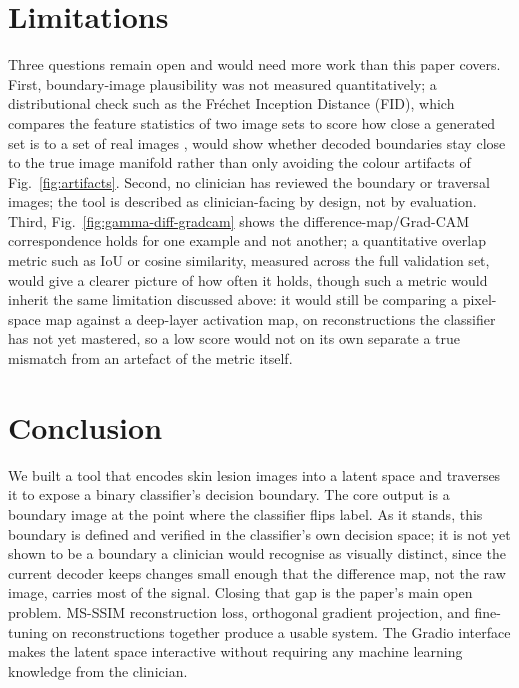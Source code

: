 \documentclass[conference,compsoc]{IEEEtran}
\begin{document}
\section{Limitations}
Three questions remain open and would need more work than this paper covers. First, boundary-image plausibility was not measured quantitatively; a distributional check such as the Fr\'echet Inception Distance (FID), which compares the feature statistics of two image sets to score how close a generated set is to a set of real images \cite{fid}, would show whether decoded boundaries stay close to the true image manifold rather than only avoiding the colour artifacts of Fig.~\ref{fig:artifacts}. Second, no clinician has reviewed the boundary or traversal images; the tool is described as clinician-facing by design, not by evaluation. Third, Fig.~\ref{fig:gamma-diff-gradcam} shows the difference-map/Grad-CAM correspondence holds for one example and not another; a quantitative overlap metric such as IoU or cosine similarity, measured across the full validation set, would give a clearer picture of how often it holds, though such a metric would inherit the same limitation discussed above: it would still be comparing a pixel-space map against a deep-layer activation map, on reconstructions the classifier has not yet mastered, so a low score would not on its own separate a true mismatch from an artefact of the metric itself.

\section{Conclusion}
We built a tool that encodes skin lesion images into a latent space and traverses it to expose a binary classifier's decision boundary. The core output is a boundary image at the point where the classifier flips label. As it stands, this boundary is defined and verified in the classifier's own decision space; it is not yet shown to be a boundary a clinician would recognise as visually distinct, since the current decoder keeps changes small enough that the difference map, not the raw image, carries most of the signal. Closing that gap is the paper's main open problem. MS-SSIM reconstruction loss, orthogonal gradient projection, and fine-tuning on reconstructions together produce a usable system. The Gradio interface makes the latent space interactive without requiring any machine learning knowledge from the clinician.
\end{document}
